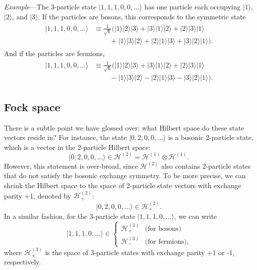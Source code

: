 \documentclass[prx,12pt]{revtex4-2}
\begin{document}
\vskip -0.1in
\begin{framed}
\noindent
\textit{Example}---The 3-particle state $|1,1,1,0,0,\dots\rangle$ has
one particle each occupying $|1\rangle$, $|2\rangle$, and $|3\rangle$.
If the particles are bosons, this corresponds to the symmetric state
\begin{align}
  \begin{aligned}|1,1,1,0,0,\dots\rangle &\equiv \frac{1}{\sqrt{6}}\Big(|1\rangle|2\rangle|3\rangle + |3\rangle|1\rangle|2\rangle + |2\rangle|3\rangle|1\rangle \\&\;\qquad+ |1\rangle|3\rangle|2\rangle + |2\rangle|1\rangle|3\rangle + |3\rangle|2\rangle|1\rangle \Big).
  \end{aligned}
\end{align}
And if the particles are fermions,
\begin{align}
  \begin{aligned}|1,1,1,0,0,\dots\rangle &\equiv \frac{1}{\sqrt{6}} \Big(|1\rangle|2\rangle|3\rangle + |3\rangle|1\rangle|2\rangle + |2\rangle|3\rangle|1\rangle \\&\;\qquad - |1\rangle|3\rangle|2\rangle - |2\rangle|1\rangle|3\rangle - |3\rangle|2\rangle|1\rangle\Big).
  \end{aligned}
\end{align}
\end{framed}

\subsection{Fock space}

There is a subtle point we have glossed over: what Hilbert space do
these state vectors reside in?  For instance, the state
$|0,2,0,0,\dots\rangle$ is a bosonic 2-particle state, which is a
vector in the 2-particle Hilbert space:
\begin{equation}
  |0,2,0,0,\dots\rangle \in \mathscr{H}^{(2)} = \mathscr{H}^{(1)}\otimes
\mathscr{H}^{(1)}.
\end{equation}
However, this statement is over-broad, since $\mathscr{H}^{(2)}$ also
contains 2-particle states that do not satisfy the bosonic exchange
symmetry.  To be more precise, we can shrink the Hilbert space to the
space of 2-particle state vectors with exchange parity +1, denoted by
$\mathscr{H}^{(2)}_+$:
\begin{equation}
  |0,2,0,0,\dots\rangle \in \mathscr{H}^{(2)}_+.
\end{equation}
In a similar fashion, for the 3-particle state
$|1,1,1,0,\dots\rangle$, we can write
\begin{equation}
  |1,1,1,0,\dots\rangle \in
  \begin{cases}
    \mathscr{H}^{(3)}_+ & \textrm{(for bosons)} \\
    \mathscr{H}^{(3)}_- & \textrm{(for fermions)},
  \end{cases}
\end{equation}
where $\mathscr{H}^{(3)}_\pm$ is the space of 3-particle states with
exchange parity +1 or -1, respectively.
\end{document}
